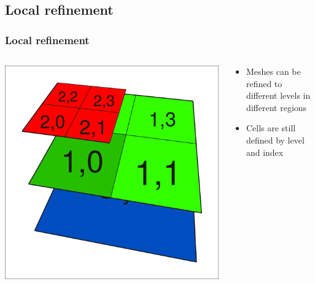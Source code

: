 \subsection{Local refinement}
\begin{frame}
  \frametitle{Local refinement}
  \begin{columns}
    \begin{column}{.5\textwidth}
      \includegraphics[width=\textwidth]{graph/step1-1b}
    \end{column}
    \begin{column}{.5\textwidth}
      \begin{itemize}
      \item Meshes can be refined to different levels in different regions
      \item Cells are still defined by level and index
      \end{itemize}
    \end{column}
  \end{columns}
\end{frame}

